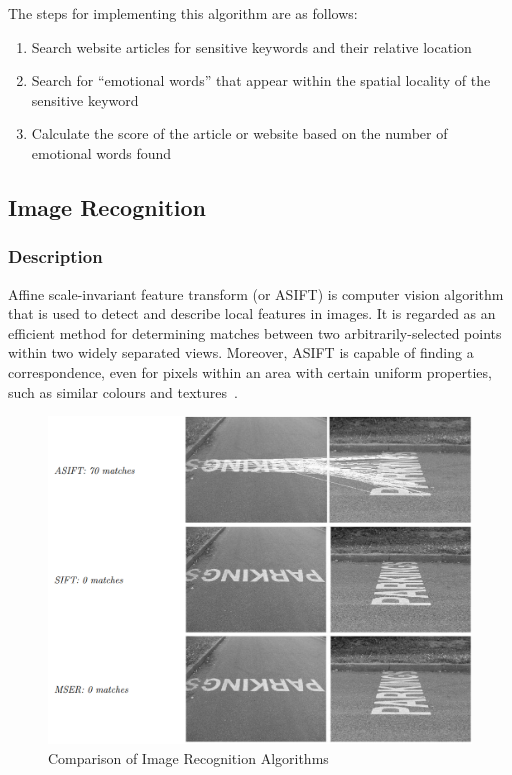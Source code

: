       The steps for implementing this algorithm are as follows:
      \begin{enumerate}
        \item Search website articles for sensitive keywords and their relative location
        \item Search for ``emotional words'' that appear within the spatial locality of the sensitive keyword
        \item Calculate the score of the article or website based on the number of emotional words found
      \end{enumerate}

  \subsection{Image Recognition}

    \subsubsection{Description}

      Affine scale-invariant feature transform (or ASIFT) is computer vision algorithm that is used to detect and describe local features in images. It is regarded as an efficient method for determining matches between two arbitrarily-selected points within two widely separated views. Moreover, ASIFT is capable of finding a correspondence, even for pixels within an area with certain uniform properties, such as similar colours and textures~\cite{}.

      \begin{figure}
        \centering
        \begin{minipage}{12cm}
          \centering
          \includegraphics[width=12cm]{inc/image_recognition_comparison.png}
          \caption{Comparison of Image Recognition Algorithms}
          \label{fig:image_recognition_comparison}
        \end{minipage}
      \end{figure}

